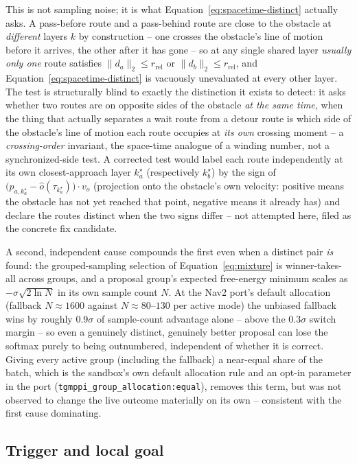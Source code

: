 \documentclass[11pt,a4paper]{article}
\begin{document}
This is not sampling noise; it is what
Equation~\eqref{eq:spacetime-distinct} actually asks. A pass-before route and
a pass-behind route are close to the obstacle at \emph{different} layers $k$
by construction -- one crosses the obstacle's line of motion before it
arrives, the other after it has gone -- so at any single shared layer
\emph{usually only one} route satisfies $\lVert d_a\rVert_2\le r_{\mathrm{rel}}$
or $\lVert d_b\rVert_2\le r_{\mathrm{rel}}$, and
Equation~\eqref{eq:spacetime-distinct} is vacuously unevaluated at every
other layer. The test is structurally blind to exactly the distinction it
exists to detect: it asks whether two routes are on opposite sides of the
obstacle \emph{at the same time}, when the thing that actually separates a
wait route from a detour route is which side of the obstacle's line of
motion each route occupies at \emph{its own} crossing moment -- a
\emph{crossing-order} invariant, the space-time analogue of a winding
number, not a synchronized-side test. A corrected test would label each
route independently at its own closest-approach layer $k^\star_a$
(respectively $k^\star_b$) by the sign of
$\bigl(p_{a,k^\star_a}-\hat o(\tau_{k^\star_a})\bigr)\cdot v_o$ (projection
onto the obstacle's own velocity: positive means the obstacle has not yet
reached that point, negative means it already has) and declare the routes
distinct when the two signs differ -- not attempted here, filed as the
concrete fix candidate.

A second, independent cause compounds the first even when a distinct pair
\emph{is} found: the grouped-sampling selection of Equation~\eqref{eq:mixture}
is winner-takes-all across groups, and a proposal group's expected free-energy
minimum scales as $-\sigma\sqrt{2\ln N}$ in its own sample count $N$. At the
Nav2 port's default allocation (fallback $N\approx1600$ against
$N\approx80$--$130$ per active mode) the unbiased fallback wins by roughly
$0.9\sigma$ of sample-count advantage alone -- above the $0.3\sigma$ switch
margin -- so even a genuinely distinct, genuinely better proposal can lose
the softmax purely to being outnumbered, independent of whether it is
correct. Giving every active group (including the fallback) a near-equal
share of the batch, which is the sandbox's own default allocation rule and
an opt-in parameter in the port (\texttt{tgmppi\_group\_allocation:equal}),
removes this term, but was not observed to change the live outcome
materially on its own -- consistent with the first cause dominating.

\subsection{Trigger and local goal}
\end{document}

